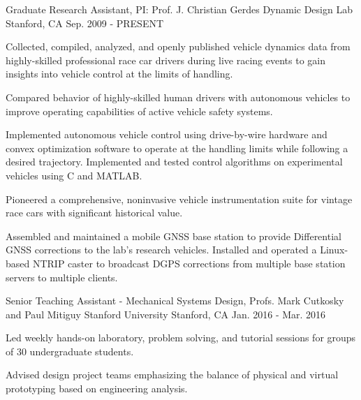 \begin{cventries}
  \cventry
    {Graduate Research Assistant, PI: Prof. J. Christian Gerdes}
    {Dynamic Design Lab}
    {Stanford, CA}
    {Sep. 2009 - PRESENT}
    {
      \begin{cvitems}
        \item {Collected, compiled, analyzed, and openly published vehicle dynamics data from highly-skilled professional race car drivers during live racing events to gain insights into vehicle control at the limits of handling.}
        \item {Compared behavior of highly-skilled human drivers with autonomous vehicles to improve operating capabilities of active vehicle safety systems.}
        \item {Implemented autonomous vehicle control using drive-by-wire hardware and convex optimization software to operate at the handling limits while following a desired trajectory. Implemented and tested control algorithms on experimental vehicles using C and MATLAB.}
        \item {Pioneered a comprehensive, noninvasive vehicle instrumentation suite for vintage race cars with significant historical value.}
        \item {Assembled and maintained a mobile GNSS base station to provide Differential GNSS corrections to the lab's research vehicles. Installed and operated a Linux-based NTRIP caster to broadcast DGPS corrections from multiple base station servers to multiple clients.}
      \end{cvitems}
    }
  \cventry
    {Senior Teaching Assistant - Mechanical Systems Design, Profs. Mark Cutkosky and Paul Mitiguy}
    {Stanford University}
    {Stanford, CA}
    {Jan. 2016 - Mar. 2016}
    {
      \begin{cvitems}
        \item {Led weekly hands-on laboratory, problem solving, and tutorial sessions for groups of 30 undergraduate students.}
        \item {Advised design project teams emphasizing the balance of physical and virtual prototyping based on engineering analysis.}
      \end{cvitems}
}
\end{cventries}
